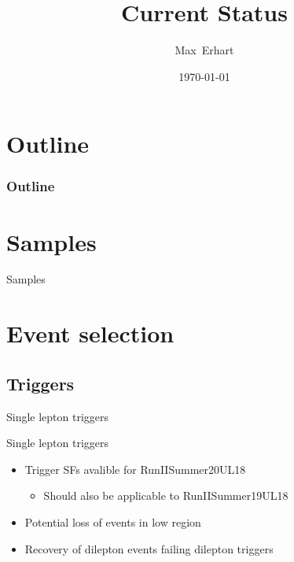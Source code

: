 \documentclass[18pt]{beamer}
\title[Current Status]{Current Status
}
\author[Max~Erhart]{Max~Erhart}
\date{\today}
\begin{document}


\begin{frame}
\titlepage
\end{frame}

\section*{Outline}
\begin{frame}[label={outline}]
	\frametitle{Outline}
	\tableofcontents
\end{frame}

\section{Samples}

\begin{frame}{Samples}
    
\end{frame}
\section{Event selection}

\subsection{Triggers}
\begin{frame}{Single lepton triggers}
	
\end{frame}

\begin{frame}{Single lepton triggers}
	\begin{itemize}
		\item Trigger SFs avalible for RunIISummer20UL18
		\begin{itemize}
			\item Should also be applicable to RunIISummer19UL18
		\end{itemize}
		\item Potential loss of events in low \pT region
		\item Recovery of dilepton events failing dilepton triggers
	\end{itemize}
	
\end{frame}
\end{document}
